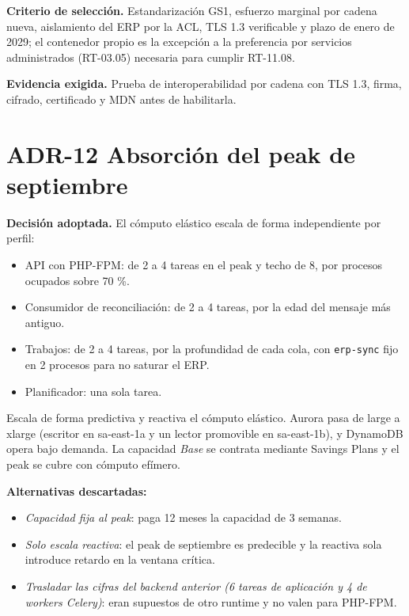 \textbf{Criterio de selección.} Estandarización GS1, esfuerzo marginal por cadena nueva, aislamiento del ERP por la ACL, TLS 1.3 verificable y plazo de enero de 2029; el contenedor propio es la excepción a la preferencia por servicios administrados (RT-03.05) necesaria para cumplir RT-11.08.

\textbf{Evidencia exigida.} Prueba de interoperabilidad por cadena con TLS 1.3, firma, cifrado, certificado y MDN antes de habilitarla.

\section{ADR-12 \textperiodcentered{} Absorción del peak de septiembre}
\label{sub:adr-12}

\textbf{Decisión adoptada.} El cómputo elástico escala de forma independiente por perfil:

\begin{itemize}
  \item API con PHP-FPM: de 2 a 4 tareas en el peak y techo de 8, por procesos ocupados sobre 70 \%.
  \item Consumidor de reconciliación: de 2 a 4 tareas, por la edad del mensaje más antiguo.
  \item Trabajos: de 2 a 4 tareas, por la profundidad de cada cola, con \texttt{erp-sync} fijo en 2 procesos para no saturar el ERP.
  \item Planificador: una sola tarea.
\end{itemize}

Escala de forma predictiva y reactiva el cómputo elástico. Aurora pasa de large a xlarge (escritor en sa-east-1a y un lector promovible en sa-east-1b), y DynamoDB opera bajo demanda. La capacidad \emph{Base} se contrata mediante Savings Plans y el peak se cubre con cómputo efímero.

\textbf{Alternativas descartadas:}

\begin{itemize}
  \item \emph{Capacidad fija al peak}: paga 12 meses la capacidad de 3 semanas.
  \item \emph{Solo escala reactiva}: el peak de septiembre es predecible y la reactiva sola introduce retardo en la ventana crítica.
  \item \emph{Trasladar las cifras del backend anterior (6 tareas de aplicación y 4 de workers Celery)}: eran supuestos de otro runtime y no valen para PHP-FPM.
\end{itemize}

